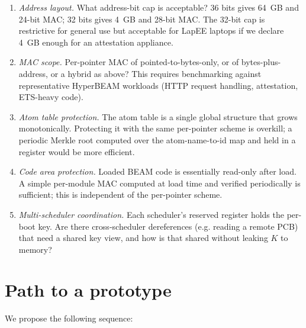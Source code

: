 \documentclass[10pt,a4paper]{article}
\begin{document}
\begin{enumerate}
\item \emph{Address layout.} What address-bit cap is acceptable?
36 bits gives 64~GB and 24-bit MAC; 32 bits gives 4~GB and 28-bit MAC.
The 32-bit cap is restrictive for general use but acceptable for
LapEE laptops if we declare 4~GB enough for an attestation appliance.
\item \emph{MAC scope.} Per-pointer MAC of pointed-to-bytes-only, or
of bytes-plus-address, or a hybrid as above? This requires
benchmarking against representative HyperBEAM workloads (HTTP request
handling, attestation, ETS-heavy code).
\item \emph{Atom table protection.} The atom table is a single global
structure that grows monotonically. Protecting it with the same
per-pointer scheme is overkill; a periodic Merkle root computed over
the atom-name-to-id map and held in a register would be more
efficient.
\item \emph{Code area protection.} Loaded BEAM code is essentially
read-only after load. A simple per-module MAC computed at load time
and verified periodically is sufficient; this is independent of the
per-pointer scheme.
\item \emph{Multi-scheduler coordination.} Each scheduler's reserved
register holds the per-boot key. Are there cross-scheduler dereferences
(e.g. reading a remote PCB) that need a shared key view, and how is
that shared without leaking $K$ to memory?
\end{enumerate}

\section{Path to a prototype}

We propose the following sequence:
\end{document}
